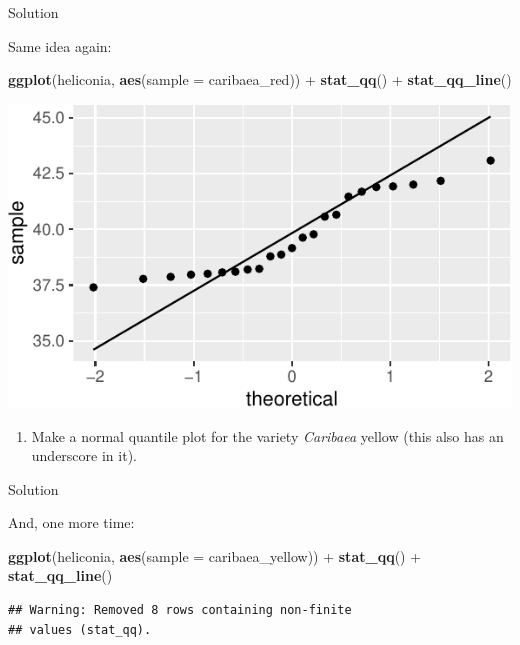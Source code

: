 \documentclass[]{tufte-book}
\newenvironment{Shaded}{}{}
\newcommand{\DataTypeTok}[1]{\textcolor[rgb]{0.56,0.13,0.00}{#1}}
\newcommand{\KeywordTok}[1]{\textcolor[rgb]{0.00,0.44,0.13}{\textbf{#1}}}
\newcommand{\NormalTok}[1]{#1}
\newcommand{\OperatorTok}[1]{\textcolor[rgb]{0.40,0.40,0.40}{#1}}
\newcommand{\StringTok}[1]{\textcolor[rgb]{0.25,0.44,0.63}{#1}}
\providecommand{\tightlist}{%
  \setlength{\itemsep}{0pt}\setlength{\parskip}{0pt}}
\theoremstyle{definition}
\theoremstyle{definition}
\theoremstyle{definition}
\theoremstyle{remark}
\begin{document}
Solution

Same idea again:

\begin{Shaded}
\begin{Highlighting}[]
\KeywordTok{ggplot}\NormalTok{(heliconia, }\KeywordTok{aes}\NormalTok{(}\DataTypeTok{sample =}\NormalTok{ caribaea_red)) }\OperatorTok{+}\StringTok{ }
\StringTok{    }\KeywordTok{stat_qq}\NormalTok{() }\OperatorTok{+}\StringTok{ }\KeywordTok{stat_qq_line}\NormalTok{()}
\end{Highlighting}
\end{Shaded}

\includegraphics{09-normal-quantile_files/figure-latex/unnamed-chunk-5-1}

\begin{enumerate}
\def\labelenumi{(\alph{enumi})}
\setcounter{enumi}{3}
\tightlist
\item
  Make a normal quantile plot for the variety \emph{Caribaea} yellow
  (this also has an underscore in it).
\end{enumerate}

Solution

And, one more time:

\begin{Shaded}
\begin{Highlighting}[]
\KeywordTok{ggplot}\NormalTok{(heliconia, }\KeywordTok{aes}\NormalTok{(}\DataTypeTok{sample =}\NormalTok{ caribaea_yellow)) }\OperatorTok{+}\StringTok{ }
\StringTok{    }\KeywordTok{stat_qq}\NormalTok{() }\OperatorTok{+}\StringTok{ }\KeywordTok{stat_qq_line}\NormalTok{()}
\end{Highlighting}
\end{Shaded}

\begin{verbatim}
## Warning: Removed 8 rows containing non-finite
## values (stat_qq).
\end{verbatim}
\end{document}
